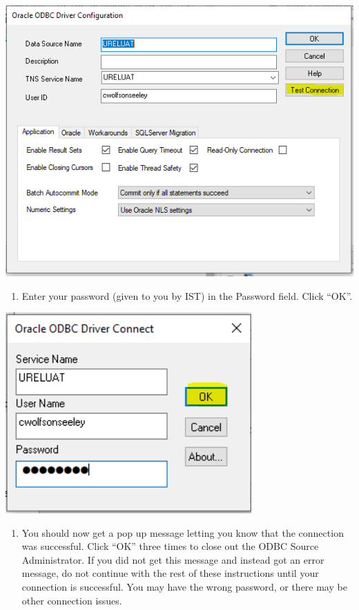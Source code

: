 \documentclass[]{book}
\providecommand{\tightlist}{%
  \setlength{\itemsep}{0pt}\setlength{\parskip}{0pt}}
\begin{document}
\includegraphics[width=7.82in]{images/configuration}

\begin{enumerate}
\def\labelenumi{\arabic{enumi})}
\setcounter{enumi}{4}
\tightlist
\item
  Enter your password (given to you by IST) in the Password field. Click ``OK''.
\end{enumerate}

\includegraphics[width=3.71in]{images/test}

\begin{enumerate}
\def\labelenumi{\arabic{enumi})}
\setcounter{enumi}{5}
\tightlist
\item
  You should now get a pop up message letting you know that the connection was successful. Click ``OK'' three times to close out the ODBC Source Administrator. If you did not get this message and instead got an error message, do not continue with the rest of these instructions until your connection is successful. You may have the wrong password, or there may be other connection issues.
\end{enumerate}
\end{document}
